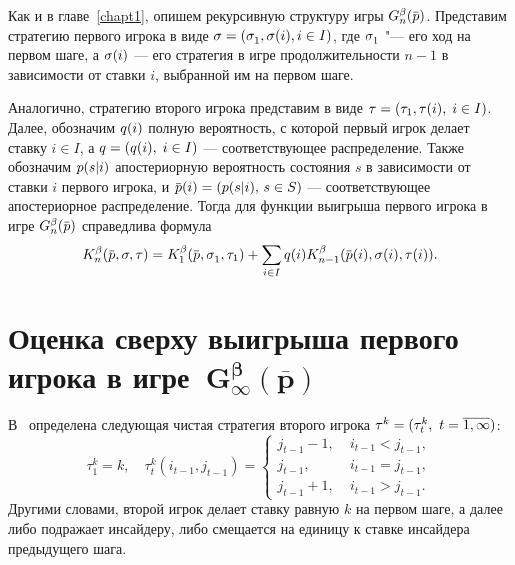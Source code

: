 {Как и в главе~\ref{chapt1}, опишем рекурсивную структуру игры $\theG{n}(\pd)$.
Представим стратегию первого игрока в виде $\sigmar = (\sigmas{1}, \sigmara{i}, i \in I)$, где $\sigmas{1}$ "--- его ход на первом шаге, а $\sigma(i)$ --- его стратегия в игре продолжительности $n-1$ в зависимости от ставки $i$, выбранной им на первом шаге.

Аналогично, стратегию второго игрока представим в виде $\tau = (\tau_{1}, \tau(i), \; i \in I)$.
%
Далее, обозначим $q(i)$ полную вероятность, с которой первый игрок делает ставку $i \in I$, а $q = (q(i), \; i \in I)$ --- соответствующее распределение.
Также обозначим $p(s|i)$ апостериорную вероятность состояния $s$ в зависимости от ставки $i$ первого игрока, и $\pad{i} = (\pac{s}{i}, \, s \in S)$ --- соответствующее апостериорное распределение.
Тогда для функции выигрыша первого игрока в игре $\theG{n}(\pd)$ справедлива формула
\begin{equation*}
  \K{n}(\pd, \sigmar, \taur) =
  \K{1}(\pd, \sigmas{1}, \taus{1}) +
  \sum_{i \in I} \qc{i} \K{n-1}(\pad{i}, \sigmara{i}, \taura{i}).
\end{equation*}

\section{Оценка сверху выигрыша первого игрока в игре~$\mathbf{G^\beta_\infty(\overline{p})}$}
\label{ch2:sec:upper-bound}

В~\cite{domansky11} определена следующая чистая стратегия второго игрока $\tau^k = (\tau^k_t,\ t = \overline{1, \infty})$:
\begin{equation*}
  \tau^k_1 = k, \quad
  \tau^k_t(i_{t-1}, j_{t-1}) = \begin{cases}
    j_{t-1} - 1, &\; i_{t-1} < j_{t-1},\\
    j_{t-1}, &\; i_{t-1} = j_{t-1},\\
    j_{t-1}+1, &\; i_{t-1} > j_{t-1}.
  \end{cases}
\end{equation*}
Другими словами, второй игрок делает ставку равную $k$ на первом шаге, а далее либо подражает инсайдеру, либо смещается на единицу к ставке инсайдера предыдущего шага.

}
